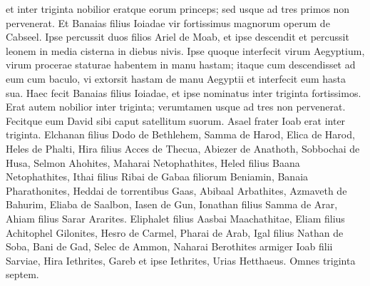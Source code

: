 \begin{biblechapter}
\verse et inter triginta nobilior eratque eorum princeps; sed usque ad tres primos non pervenerat. 
\verse Et Banaias filius Ioiadae vir fortissimus magnorum operum de Cabseel. Ipse percussit duos filios Ariel de Moab, et ipse descendit et percussit leonem in media cisterna in diebus nivis. 
\verse Ipse quoque interfecit virum Aegyptium, virum procerae staturae habentem in manu hastam; itaque cum descendisset ad eum cum baculo, vi extorsit hastam de manu Aegyptii et interfecit eum hasta sua.  
\verse Haec fecit Banaias filius Ioiadae, et ipse nominatus inter triginta fortissimos. 
\verse Erat autem nobilior inter triginta; verumtamen usque ad tres non pervenerat. Fecitque eum David sibi caput satellitum suorum. 
\verse Asael frater Ioab erat inter triginta. Elchanan filius Dodo de Bethlehem,  
\verse Samma de Harod, Elica de Harod, 
\verse Heles de Phalti, Hira filius Acces de Thecua, 
\verse Abiezer de Anathoth, Sobbochai de Husa, 
\verse Selmon Ahohites, Maharai Netophathites, 
\verse Heled filius Baana Netophathites, Ithai filius Ribai de Gabaa filiorum Beniamin, 
\verse Banaia Pharathonites, Heddai de torrentibus Gaas, 
\verse Abibaal Arbathites, Azmaveth de Bahurim, 
\verse Eliaba de Saalbon, Iasen de Gun, 
\verse Ionathan filius Samma de Arar, Ahiam filius Sarar Ararites.  
\verse Eliphalet filius Aasbai Maachathitae, Eliam filius Achitophel Gilonites,  
\verse Hesro de Carmel, Pharai de Arab, 
\verse Igal filius Nathan de Soba, Bani de Gad, 
\verse Selec de Ammon, Naharai Berothites armiger Ioab filii Sarviae,  
\verse Hira Iethrites, Gareb et ipse Iethrites, 
\verse Urias Hetthaeus. Omnes triginta septem. 
\end{biblechapter}

